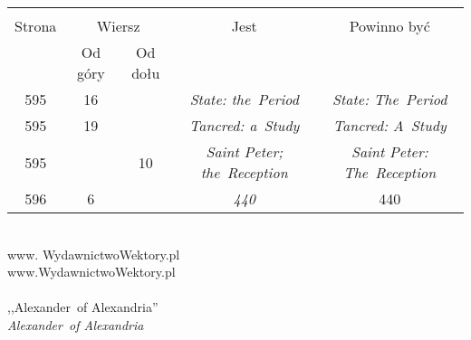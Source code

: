 \documentclass[a4paper,11pt]{article}
\begin{document}
\begin{center}
  \begin{tabular}{|c|c|c|c|c|}
    \hline
    & \multicolumn{2}{c|}{} & & \\
    Strona & \multicolumn{2}{c|}{Wiersz}& Jest & Powinno być \\ \cline{2-3}
    & Od góry & Od dołu &  &  \\ \hline
    595 & 16 & & \emph{State: the~Period} & \emph{State: The~Period} \\
    595 & 19 & & \emph{Tancred: a~Study} & \emph{Tancred: A~Study} \\
    595 & & 10 & \emph{Saint Peter; the~Reception}
           & \emph{Saint Peter: The~Reception} \\
    596 &  6 & & \emph{440} & 440 \\
    \hline
  \end{tabular}
\end{center}
\noi
{} \\
\Jest www. WydawnictwoWektory.pl \\
\Pow  www.WydawnictwoWektory.pl \\
 \\
\Jest ,,Alexander~of Alexandria'' \\
\Pow  \emph{Alexander~of Alexandria} \\

\vspace{\spaceTwo}





\end{document}
